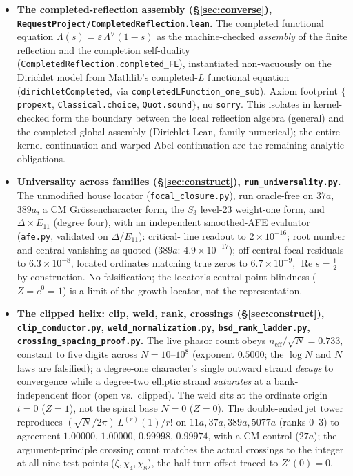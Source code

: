 \documentclass[11pt]{article}
\theoremstyle{definition}
\renewcommand{\Re}{\operatorname{Re}}
\begin{document}
\begin{itemize}
\item \textbf{The completed-reflection assembly (\S\ref{sec:converse}),
\texttt{RequestProject/CompletedReflection.lean}.} The completed functional equation
$\Lambda(s)=\varepsilon\,\Lambda^\vee(1-s)$ as the machine-checked \emph{assembly} of the finite reflection
and the completion self-duality (\texttt{CompletedReflection.completed\_FE}), instantiated non-vacuously on
the Dirichlet model from Mathlib's completed-$L$ functional equation (\texttt{dirichletCompleted}, via
\texttt{completedLFunction\_one\_sub}). Axiom footprint $\{$\texttt{propext}, \texttt{Classical.choice},
\texttt{Quot.sound}$\}$, no \texttt{sorry}. This isolates in kernel-checked form the boundary between the
local reflection algebra (general) and the completed global assembly (Dirichlet Lean, family numerical);
the entire-kernel continuation and warped-Abel continuation are the remaining analytic obligations.

\item \textbf{Universality across families (\S\ref{sec:construct}), \texttt{run\_universality.py}.}
The unmodified house locator (\texttt{focal\_closure.py}), run oracle-free on $37a$, $389a$, a CM
Gr\"ossencharacter form, the $S_3$ level-$23$ weight-one form, and $\Delta\times E_{11}$ (degree four),
with an independent smoothed-AFE evaluator (\texttt{afe.py}, validated on $\Delta$/$E_{11}$): critical-
line readout to $2\times10^{-16}$; root number and central vanishing as quoted
($389a$: $4.9\times10^{-17}$); off-central focal residuals to $6.3\times10^{-8}$, located ordinates
matching true zeros to $6.7\times10^{-9}$, $\Re s=\tfrac12$ by construction. No falsification; the
locator's central-point blindness ($Z=e^{0}=1$) is a limit of the growth locator, not the
representation.

\item \textbf{The clipped helix: clip, weld, rank, crossings (\S\ref{sec:construct}),
\texttt{clip\_conductor.py}, \texttt{weld\_normalization.py}, \texttt{bsd\_rank\_ladder.py},
\texttt{crossing\_spacing\_proof.py}.} The live phasor count obeys $n_{\mathrm{eff}}/\sqrt N=0.733$,
constant to five digits across $N=10$–$10^8$ (exponent $0.5000$; the $\log N$ and $N$ laws are
falsified); a degree-one character's single outward strand \emph{decays} to convergence while a
degree-two elliptic strand \emph{saturates} at a bank-independent floor (open vs.\ clipped). The weld
sits at the ordinate origin $t=0$ ($Z=1$), not the spiral base $N=0$ ($Z=0$). The double-ended jet
tower reproduces $(\sqrt N/2\pi)\,L^{(r)}(1)/r!$ on $11a,37a,389a,5077a$ (ranks $0$–$3$) to agreement
$1.00000,\,1.00000,\,0.99998,\,0.99974$, with a CM control ($27a$); the argument-principle crossing
count matches the actual crossings to the integer at all nine test points ($\zeta,\chi_4,\chi_8$), the
half-turn offset traced to $Z'(0)=0$.


\end{itemize}
\end{document}
